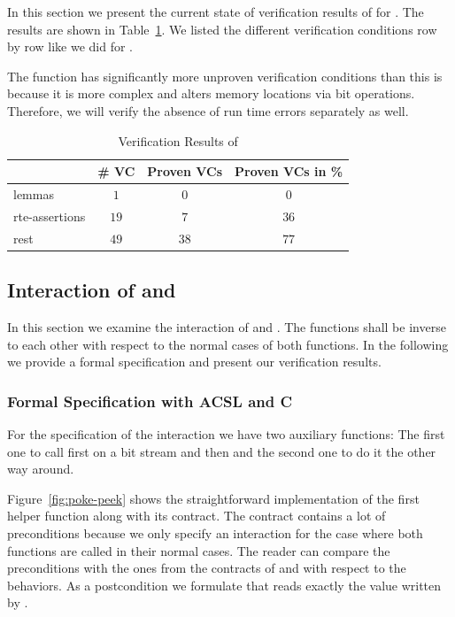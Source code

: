 In this section we present the current state of verification results of 
for \poke.
The results are shown in Table~\ref{tab:results-poke}.
 We listed the different verification conditions 
 row by row like we did for \peek.

The function \poke has significantly more unproven verification conditions than \peek
this is because it is more complex and alters memory locations via bit operations.
Therefore, we will verify the absence of run time errors separately as well.

\begin{table}[hbt]
  \centering
  \begin{tabular}[h]{lccc}
    \toprule
     & \# VC & Proven VCs & Proven VCs in \%\\
    \midrule
    lemmas & $1$ &$0$ & $0$ \\
    rte-assertions&$19$&$7$&$36$\\
    rest &$49$ &$38$&$77$\\
    \bottomrule
  \end{tabular}
  \caption{Verification Results of \poke}
  \label{tab:results-poke}
\end{table}



\clearpage
\subsection{Interaction of \peek and \poke}
\label{interaction}


In this section we examine the interaction of 
\peek and \poke. The functions shall be inverse to each other
with respect to the normal cases of both functions.
In the following we provide a formal specification and present
our verification results.


\subsubsection{Formal Specification with ACSL and C}

For the specification of the interaction we have two auxiliary \isoc functions:
The first one to call first \poke on a bit stream and then \peek
and the second one to do it the other way around.

Figure~\ref{fig:poke-peek} shows the straightforward implementation 
of the first helper function along with its \acsl contract.
The contract contains a lot of preconditions because we
only specify an interaction for the case where both 
functions are called in their normal
cases. The reader can compare the preconditions with the ones from
the contracts of \peek and \poke with respect to the  behaviors.
As a postcondition we formulate that \peek reads exactly the value
written by \poke.

